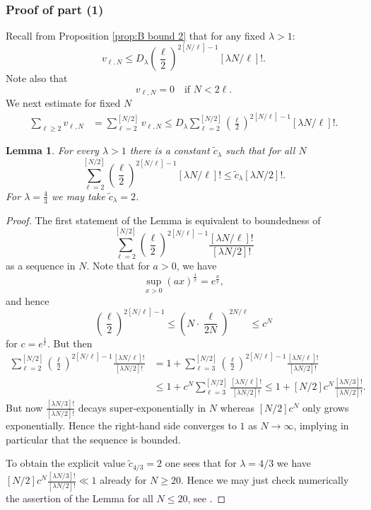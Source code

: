 \documentclass[12pt]{amsart}
\newtheorem{lem}[thm]{Lemma}
\theoremstyle{definition}
\numberwithin{equation}{section}
\renewcommand{\tilde}{\widetilde}
\newcommand{\numcheck}[1]{\cite[Computation #1]{SupplementaryNotebook}}
\theoremstyle{definition} %
\theoremstyle{remark}
\begin{document}
\subsubsection*{Proof of part (1)}
Recall from Proposition \ref{prop:B bound 2} that for any fixed $\lambda>1$:
\[
        v_{\ell,N}
        \leq 
      D_\lambda 
      \left(\frac{\ell}{2}\right)^{2[N/\ell]-1}
      [\lambda N/\ell]!
      .
\]
Note also that 
\[
    v_{\ell,N} = 0 \quad \text{if $N<2\ell$}.
\]
We next estimate for fixed $N$
\begin{align*}
\sum_{\ell \geq 2} v_{\ell,N}
&=
\sum_{\ell = 2}^{[N/2]} v_{\ell,N}
\leq 
D_\lambda 
\sum_{\ell = 2}^{[N/2]}
\left(\frac{\ell}{2}\right)^{2[N/\ell]-1}
[\lambda N/\ell]!.
\end{align*}

\begin{lem}
For every $\lambda>1$ there is a constant $\tilde c_\lambda$ such that for all $N$
\[
    \sum_{\ell = 2}^{[N/2]}
    \left(\frac{\ell}{2}\right)^{2[N/\ell]-1}
    [\lambda N/\ell]!
    \leq \tilde c_\lambda 
    [\lambda N/2]!.
\]
For $\lambda=\frac43$ we may take $\tilde c_\lambda =2$.
\end{lem}
\begin{proof}
    The first statement of the Lemma is equivalent to boundedness of 
    \[
        \sum_{\ell = 2}^{[N/2]}
    \left(\frac{\ell}{2}\right)^{2[N/\ell]-1}
    \frac{[\lambda N/\ell]!}{[\lambda N/2]!}
    \]
as a sequence in $N$.
    Note that for $a > 0$, we have
    \begin{equation}\label{equ:sup xx}
    \sup_{x> 0} \left(a x\right)^{\frac{1}{x}} = e^{\frac ae},
    \end{equation}
    and hence
    \[
        \left(\frac{\ell}{2}\right)^{2[N/\ell]-1}
        \leq \left( N \cdot \frac{\ell}{2N} \right)^{2N/\ell} \leq
        c^N
    \]
    for $c=e^{\frac 1e}$. But then 
    \begin{align*}
        \sum_{\ell = 2}^{[N/2]}
        \left(\frac{\ell}{2}\right)^{2[N/\ell]-1}
        \frac{[\lambda N/\ell]!}{[\lambda N/2]!}
        &=
        1
        +
        \sum_{\ell = 3}^{[N/2]}
        \left(\frac{\ell}{2}\right)^{2[N/\ell]-1}
        \frac{[\lambda N/\ell]!}{[\lambda N/2]!}
        \\&\leq 
        1
        +
        c^N
        \sum_{\ell = 3}^{[N/2]}
        \frac{[\lambda N/\ell]!}{[\lambda N/2]!}
        \leq 1+
        [N/2] c^N \frac{[\lambda N/3]!}{[\lambda N/2]!}.
    \end{align*}
    But now $\frac{[\lambda N/3]!}{[\lambda N/2]!}$ decays super-exponentially in $N$ whereas $[N/2] c^N$ only grows exponentially. Hence the right-hand side converges to $1$ as $N\to \infty$, implying in particular that the sequence is bounded.

    To obtain the explicit value $\tilde c_{4/3}=2$ one sees that for $\lambda=4/3$ we have $[N/2] c^N \frac{[\lambda N/3]!}{[\lambda N/2]!}\ll 1$ already for $N\geq 20$. Hence we may just check numerically the assertion of the Lemma for all $N\leq 20$, see \numcheck{CLAMBDA}.
\end{proof}
\end{document}
